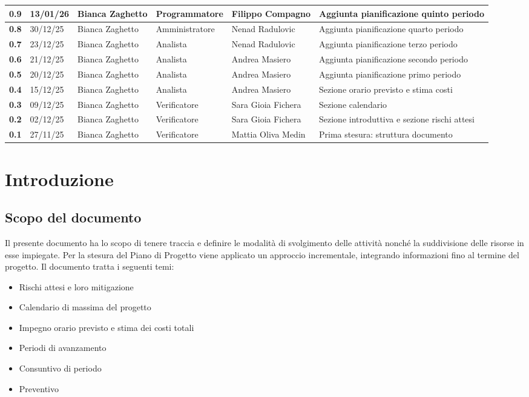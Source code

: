 \documentclass[a4paper,12pt]{article}
\begin{document}
\begin{xltabular}{\textwidth}{|l|l|X|l|X|X|}
\hline
\textbf{0.9} & 13/01/26 & Bianca Zaghetto & Programmatore & Filippo Compagno & Aggiunta pianificazione quinto periodo \\
\hline
\textbf{0.8} & 30/12/25 & Bianca Zaghetto & Amministratore & Nenad Radulovic & Aggiunta pianificazione quarto periodo \\
\hline
\textbf{0.7} & 23/12/25 & Bianca Zaghetto & Analista & Nenad Radulovic & Aggiunta pianificazione terzo periodo \\
\hline
\textbf{0.6} & 21/12/25 & Bianca Zaghetto & Analista & Andrea Masiero & Aggiunta pianificazione secondo periodo \\
\hline
\textbf{0.5} & 20/12/25 & Bianca Zaghetto & Analista & Andrea Masiero & Aggiunta pianificazione primo periodo \\
\hline
\textbf{0.4} & 15/12/25 & Bianca Zaghetto & Analista & Andrea Masiero & Sezione orario previsto e stima costi \\
\hline
\textbf{0.3} & 09/12/25 & Bianca Zaghetto & Verificatore & Sara Gioia Fichera & Sezione calendario \\
\hline
\textbf{0.2} & 02/12/25 & Bianca Zaghetto & Verificatore & Sara Gioia Fichera & Sezione introduttiva e sezione rischi attesi \\
\hline
\textbf{0.1} & 27/11/25 & Bianca Zaghetto & Verificatore & Mattia Oliva Medin & Prima stesura: struttura documento \\
\hline
\end{xltabular}

\newpage
\tableofcontents

\newpage
\listoffigures

\newpage
\listoftables

\newpage

\section{Introduzione}
    \subsection{Scopo del documento}
        Il presente documento ha lo scopo di tenere traccia e definire le modalità di svolgimento delle attività nonché la suddivisione delle risorse in esse impiegate.
        Per la stesura del Piano di Progetto viene applicato un approccio incrementale, integrando informazioni fino al termine del progetto. Il documento tratta i seguenti temi:
        \begin{itemize}
            \item Rischi attesi e loro mitigazione
            \item Calendario di massima del progetto
            \item Impegno orario previsto e stima dei costi totali
            \item Periodi di avanzamento
            \item Consuntivo di periodo
            \item Preventivo
        \end{itemize}
\end{document}
